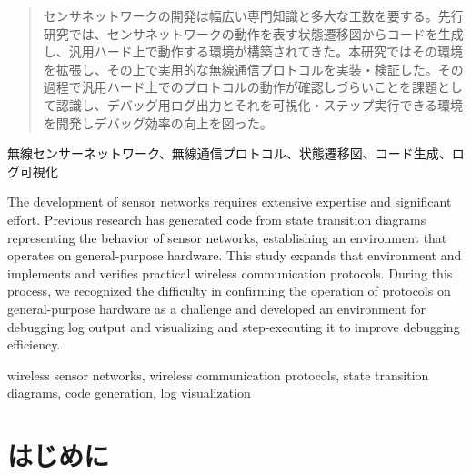 \documentclass[technicalreport]{ieicej}
\begin{document}
\begin{abstract}
センサネットワークの開発は幅広い専門知識と多大な工数を要する。先行研究では、センサネットワークの動作を表す状態遷移図からコードを生成し、汎用ハード上で動作する環境が構築されてきた。本研究ではその環境を拡張し、その上で実用的な無線通信プロトコルを実装・検証した。その過程で汎用ハード上でのプロトコルの動作が確認しづらいことを課題として認識し、デバッグ用ログ出力とそれを可視化・ステップ実行できる環境を開発しデバッグ効率の向上を図った。
\end{abstract}
\begin{keyword}
無線センサーネットワーク、無線通信プロトコル、状態遷移図、コード生成、ログ可視化
\end{keyword}

\begin{eabstract}
The development of sensor networks requires extensive expertise and significant effort. Previous research has generated code from state transition diagrams representing the behavior of sensor networks, establishing an environment that operates on general-purpose hardware. This study expands that environment and implements and verifies practical wireless communication protocols. During this process, we recognized the difficulty in confirming the operation of protocols on general-purpose hardware as a challenge and developed an environment for debugging log output and visualizing and step-executing it to improve debugging efficiency.
\end{eabstract}

\begin{ekeyword}
wireless sensor networks, wireless communication protocols, state transition diagrams, code generation, log visualization
\end{ekeyword}
\maketitle

\section{はじめに}
\end{document}
